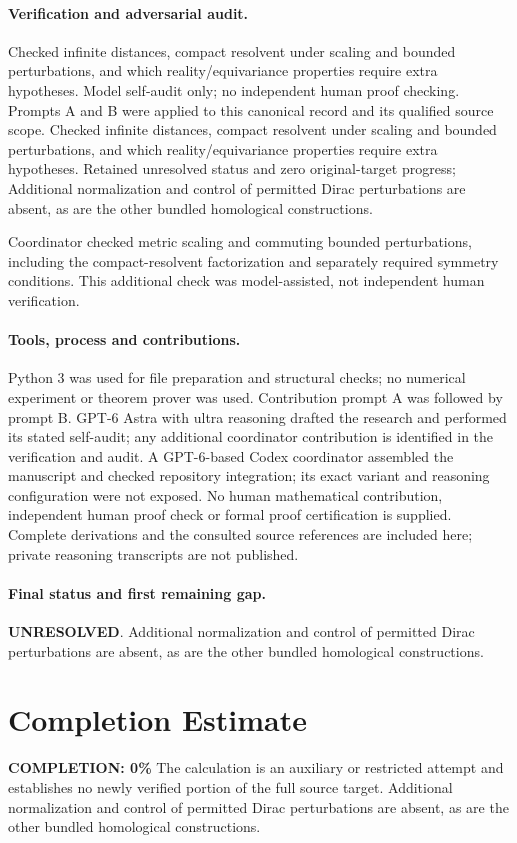 \documentclass[11pt]{article}
\begin{document}
\paragraph{Verification and adversarial audit.}
Checked infinite distances, compact resolvent under scaling and bounded perturbations, and which reality/equivariance properties require extra hypotheses. Model self-audit only; no independent human proof checking. Prompts A and B were applied to this canonical record and its qualified source scope. Checked infinite distances, compact resolvent under scaling and bounded perturbations, and which reality/equivariance properties require extra hypotheses. Retained unresolved status and zero original-target progress; Additional normalization and control of permitted Dirac perturbations are absent, as are the other bundled homological constructions.

Coordinator checked metric scaling and commuting bounded perturbations, including the compact-resolvent factorization and separately required symmetry conditions. This additional check was model-assisted, not independent human verification.

\paragraph{Tools, process and contributions.}
Python 3 was used for file preparation and structural checks; no numerical experiment or theorem prover was used. Contribution prompt A was followed by prompt B. GPT-6 Astra with ultra reasoning drafted the research and performed its stated self-audit; any additional coordinator contribution is identified in the verification and audit. A GPT-6-based Codex coordinator assembled the manuscript and checked repository integration; its exact variant and reasoning configuration were not exposed. No human mathematical contribution, independent human proof check or formal proof certification is supplied. Complete derivations and the consulted source references are included here; private reasoning transcripts are not published.

\paragraph{Final status and first remaining gap.}
\textbf{UNRESOLVED}. Additional normalization and control of permitted Dirac perturbations are absent, as are the other bundled homological constructions.

\section{Completion Estimate}
\noindent\textbf{COMPLETION: 0\%}
The calculation is an auxiliary or restricted attempt and establishes no newly verified portion of the full source target. Additional normalization and control of permitted Dirac perturbations are absent, as are the other bundled homological constructions.
\end{document}
